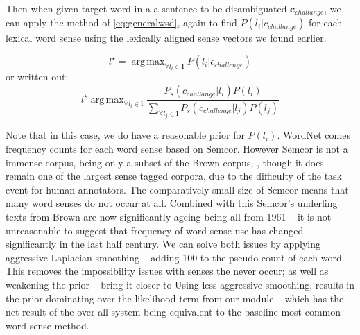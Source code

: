 \documentclass{sig-alternate}
\renewcommand{\c}{\mathbf{c}}
\renewcommand{\l}{\mathbf{l}}
\DeclareMathOperator*{\argmax}{arg\,max}
\begin{document}
Then when given target word in a a sentence to be disambiguated $\c_{challange}$, we can apply the method of \cref{eq:generalwsd}, again to find $P(l_i|c_{challange})$ for each lexical word sense using the lexically aligned sense vectors we found earlier.

\begin{equation}\label{eq:lexicalwsd}
l^\star = \argmax_{\forall l_i \in \l} P(l_i|c_{challenge})
\end{equation}
or written out:
\begin{equation}\label{eq:lexicalwsdexpanded}
l^\star \argmax_{\forall l_i \in \l} \frac{P_s(c_{challange}|l_i)P(l_i)}{\sum_{\forall l_j \in \l} P_s(c_{challenge}|l_j)P(l_j)}
\end{equation}

Note that in this case, we do have a reasonable prior for $P(l_i)$.
WordNet comes frequency counts for each word sense based on Semcor\cite{tengi1998design}.
However Semcor is not a immense corpus, being only a subset of the Brown corpus, , though it does remain one of the largest sense tagged corpora, due to the difficulty of the task event for human annotators.
The comparatively small size of Semcor means that many word senses do not occur at all.
Combined with this Semcor's underling texts from Brown are now significantly ageing being all from 1961 -- it is not unreasonable to suggest that frequency of word-sense use has changed significantly in the last half century.
We can solve both issues by applying aggressive Laplacian smoothing -- adding 100 to the pseudo-count of each word. This removes the impossibility issues with senses the never occur; as well as weakening the prior -- bring it closer to 
Using less aggressive smoothing, results in the prior dominating over the likelihood term from our module -- which has the net result of the over all system being equivalent to the baseline most common word sense method.


\printbibliography
\end{document}
